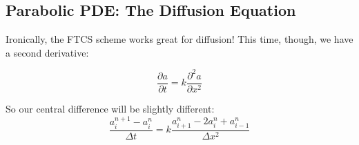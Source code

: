 \documentclass{article}
\theoremstyle{demo}
\begin{document}
\subsection{Parabolic PDE: The Diffusion Equation}
Ironically, the FTCS scheme works great for diffusion!  This time, though, we
have a second derivative:

\begin{equation}
    \frac{\partial a}{\partial t} = k\frac{\partial^2 a}{\partial x^2}
\end{equation}

So our central difference will be slightly different:
\begin{equation}
    \frac{a_i^{n+1} - a_i^n}{\Delta t} = k \frac{a_{i+1}^n - 2a_i^n + a_{i-1}^n}{\Delta x^2}
\end{equation}
\end{document}
